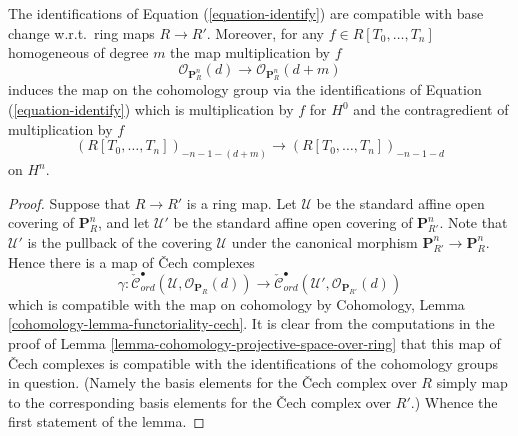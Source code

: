 \begin{lemma}
\label{lemma-identify-functorially}
The identifications of Equation (\ref{equation-identify}) are
compatible with base change w.r.t.\ ring maps $R \to R'$.
Moreover, for any $f \in R[T_0, \ldots, T_n]$ homogeneous
of degree $m$ the map multiplication by $f$
$$
\mathcal{O}_{\mathbf{P}^n_R}(d)
\longrightarrow
\mathcal{O}_{\mathbf{P}^n_R}(d + m)
$$
induces the map on the cohomology group via the identifications
of Equation (\ref{equation-identify}) which is multiplication by
$f$ for $H^0$ and the contragredient of multiplication by $f$
$$
(R[T_0, \ldots, T_n])_{-n - 1 - (d + m)}
\longrightarrow
(R[T_0, \ldots, T_n])_{-n - 1 - d}
$$
on $H^n$.
\end{lemma}

\begin{proof}
Suppose that $R \to R'$ is a ring map.
Let $\mathcal{U}$ be the standard affine open covering of $\mathbf{P}^n_R$,
and let $\mathcal{U}'$ be the standard affine open covering of
$\mathbf{P}^n_{R'}$. Note that $\mathcal{U}'$ is the pullback of the covering
$\mathcal{U}$ under the canonical morphism
$\mathbf{P}^n_{R'} \to \mathbf{P}^n_R$. Hence there
is a map of {\v C}ech complexes
$$
\gamma :
\check{\mathcal{C}}_{ord}^\bullet(\mathcal{U},
\mathcal{O}_{\mathbf{P}_R}(d))
\longrightarrow
\check{\mathcal{C}}_{ord}^\bullet(\mathcal{U}',
\mathcal{O}_{\mathbf{P}_{R'}}(d))
$$
which is compatible with the map on cohomology by
Cohomology, Lemma \ref{cohomology-lemma-functoriality-cech}.
It is clear from the computations in the proof of
Lemma \ref{lemma-cohomology-projective-space-over-ring}
that this map of {\v C}ech complexes is compatible with the identifications
of the cohomology groups in question. (Namely the basis elements for
the {\v C}ech complex over $R$ simply map to the corresponding basis elements
for the {\v C}ech complex over $R'$.) Whence the first statement of the lemma.


\end{proof}

